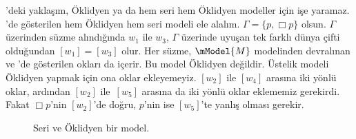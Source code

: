 \documentclass[../../../include/open-logic-section]{subfiles}
\begin{document}


'deki yaklaşım, Öklidyen ya da hem seri hem Öklidyen
modeller için işe yaramaz. 'de gösterilen hem
Öklidyen hem seri modeli ele alalım. $\Gamma=\{p,\Box p\}$ olsun.
$\Gamma$ üzerinden süzme alındığında $w_1$ ile $w_3$, $\Gamma$ üzerinde
uyuşan tek farklı dünya çifti olduğundan $[w_1]=[w_3]$ olur. Her süzme,
$\mModel{M}$ modelinden devralınan ve 'de gösterilen
okları da içerir. Bu model Öklidyen değildir. Üstelik modeli Öklidyen yapmak
için ona oklar ekleyemeyiz. $[w_2]$ ile $[w_4]$ arasına iki yönlü oklar,
ardından $[w_2]$ ile~$[w_5]$ arasına da iki yönlü oklar eklememiz gerekirdi.
Fakat $\Box p$'nin $[w_2]$'de doğru, $p$'nin ise $[w_5]$'te yanlış olması
gerekir.

\begin{figure}[htpb]
  \centering
  \caption{Seri ve Öklidyen bir model.}
\end{figure}
\end{document}
